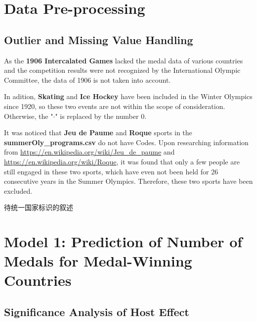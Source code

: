 \documentclass{mcmthesis}
\begin{document}
\section{Data Pre-processing}

\subsection{Outlier and Missing Value Handling}
As the \textbf{1906 Intercalated Games} lacked the medal data of various countries and the competition results were not recognized by the International Olympic Committee, the data of 1906 is not taken into account.

In adition, \textbf{Skating} and \textbf{Ice Hockey} have been included in the Winter Olympics since 1920, so these two events are not within the scope of consideration. Otherwise, the "$\cdot$" is replaced by the number $0$. 

It was noticed that \textbf{Jeu de Paume} and \textbf{Roque} sports in the {\bf summerOly\_programs.csv} do not have Codes. Upon researching information from {\color{blue}\url{https://en.wikipedia.org/wiki/Jeu_de_paume}} and {\color{blue}\url{https://en.wikipedia.org/wiki/Roque}}, it was found that only a few people are still engaged in these two sports, which have even not been held for 26 consecutive years in the Summer Olympics. Therefore, these two sports have been excluded.



待统一国家标识的叙述













\section{Model 1: Prediction of Number of Medals for Medal-Winning Countries}

\subsection{Significance Analysis of Host Effect}
\end{document}
